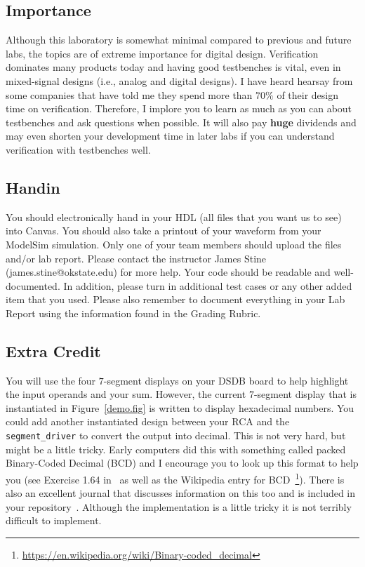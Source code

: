 \documentclass{article}
\begin{document}
\subsection{Importance}

Although this laboratory is somewhat minimal compared to previous and
future labs, the topics are of extreme importance for digital design.
Verification dominates many products today and having good testbenches
is vital, even in mixed-signal designs (i.e., analog and digital
designs).  I have heard hearsay from some companies that have told me
they spend more than  $70\%$ of their design time on verification.
Therefore, I implore you to learn as much as you can about
testbenches and ask questions when possible.  It will also pay
\textbf{huge} dividends and may even shorten your development time
in later labs if you can understand
verification with testbenches well.

\subsection{Handin}

You should electronically hand in your HDL (all files that you want
us to see) into Canvas.
You should also take a printout of your waveform 
from your ModelSim simulation.  
Only one of your team members should upload
the files and/or lab report. Please contact
the instructor James Stine (james.stine@okstate.edu) 
for more help.  Your code should be
readable and well-documented. In addition, please turn in additional
test cases or any other added item that you used. 
Please also remember to document everything in your Lab Report using
the information found in the Grading Rubric.

\subsection{Extra Credit}

You will use the four $7$-segment displays on your DSDB board to help
highlight the input operands and your sum.  However, the current
$7$-segment display that is instantiated in Figure~\ref{demo.fig} is
written to display hexadecimal numbers.  You could add another
instantiated design between your RCA and the \verb!segment_driver! to
convert the output into decimal.  This is not very hard, but might
be a little tricky.  Early computers did this with something called
packed Binary-Coded Decimal (BCD) and I encourage you to look up this
format to help you (see Exercise 1.64 in~\cite{ddca-riscv} as well as
the Wikipedia entry for
BCD~\footnote{\url{https://en.wikipedia.org/wiki/Binary-coded_decimal}}).
There is also an excellent journal that discusses information on this too
and is included in your repository~\cite{1453497}.
Although the implementation is a little tricky it
is not terribly difficult to implement.



\end{document}

